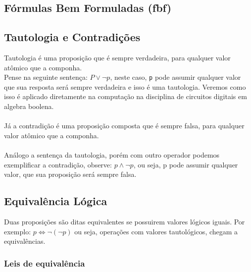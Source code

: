 \documentclass[12pt, onecolumn]{article}
\begin{document}
		\subsection{\centering Fórmulas Bem Formuladas (fbf)}

		\subsection{\centering Tautologia e Contradições}
	
	Tautologia é uma proposição que é sempre verdadeira, para qualquer valor
	atômico que a componha.\\
	Pense na seguinte sentença: $P \lor \lnot p$, neste caso, \texttt{p}
	pode assumir qualquer valor que sua resposta será sempre verdadeira e
	isso é uma tautologia. Veremos como isso é aplicado diretamente na
	computação na disciplina de circuitos digitais em algebra boolena.\\
	\\
	Já a contradição é uma proposição composta que é sempre falsa, para
	qualquer valor atômico que a componha.\\
	\\
	Análogo a sentença da tautologia, porém com outro operador podemos
	exemplificar a contradição, observe: $p \land \lnot p$, ou seja, 
	p pode assumir qualquer valor, que sua proposição será sempre falsa.
	
		\subsection{Equivalência Lógica}
	Duas proposições são ditas equivalentes se possuirem valores lógicos iguais.
	Por exemplo: $p \Longleftrightarrow \lnot(\lnot p)$ ou seja, operações
	com valores tautológicos, chegam a equivalências.\\
		
		\subsubsection{Leis de equivalência}
	
\end{document}
